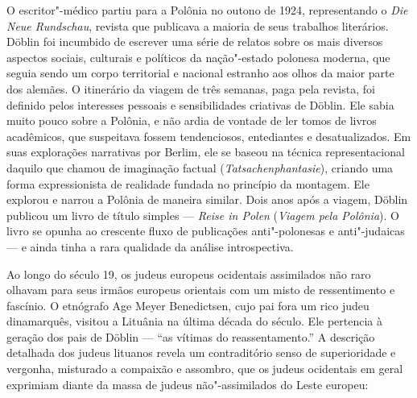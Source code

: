 O escritor"-médico partiu para a Polônia no outono de 1924, representando
o \emph{Die Neue Rundschau}, revista que publicava a maioria de seus
trabalhos literários. Döblin foi incumbido de escrever uma série de
relatos sobre os mais diversos aspectos sociais, culturais e políticos
da nação"-estado polonesa moderna, que seguia sendo um corpo territorial
e nacional estranho aos olhos da maior parte dos alemães. O itinerário
da viagem de três semanas, paga pela revista, foi definido pelos
interesses pessoais e sensibilidades criativas de Döblin. Ele sabia
muito pouco sobre a Polônia, e não ardia de vontade de ler tomos de
livros acadêmicos, que suspeitava fossem tendenciosos, entediantes e
desatualizados. Em suas explorações narrativas por Berlim, ele se baseou
na técnica representacional daquilo que chamou de imaginação factual
(\emph{Tatsachenphantasie}), criando uma forma expressionista de
realidade fundada no princípio da montagem. Ele explorou e narrou a
Polônia de maneira similar. Dois anos após a viagem, Döblin publicou um
livro de título simples --- \emph{Reise in Polen} (\emph{Viagem pela
Polônia}). O livro se opunha ao crescente fluxo de publicações
anti"-polonesas e anti"-judaicas --- e ainda tinha a rara qualidade da
análise introspectiva.

Ao longo do século 19, os judeus europeus ocidentais assimilados não
raro olhavam para seus irmãos europeus orientais com um misto de
ressentimento e fascínio. O etnógrafo Age Meyer Benedictsen, cujo pai
fora um rico judeu dinamarquês, visitou a Lituânia na última década do
século. Ele pertencia à geração dos pais de Döblin --- ``as vítimas do
reassentamento.'' A descrição detalhada dos judeus lituanos revela um
contraditório senso de superioridade e vergonha, misturado a compaixão e
assombro, que os judeus ocidentais em geral exprimiam diante da massa de
judeus não"-assimilados do Leste europeu:

